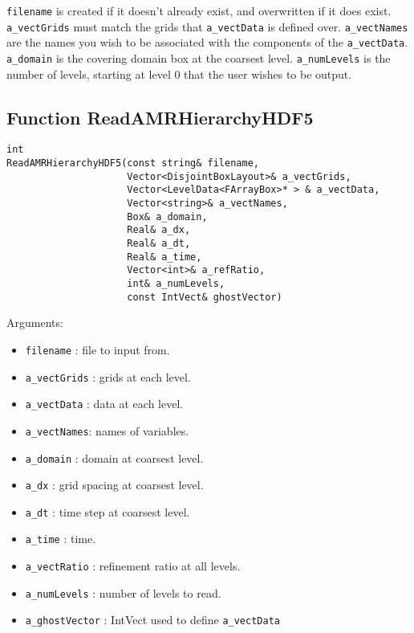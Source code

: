 \verb+filename+ is created if it doesn't already exist, and overwritten
if it does exist.  \verb+a_vectGrids+ must match the grids that 
\verb+a_vectData+ is defined over. \verb+a_vectNames+ are the names
you wish to be associated with the components of the \verb+a_vectData+.
\verb+a_domain+ is the covering domain box at the coarsest level.
\verb+a_numLevels+ is the number of levels, starting at level 0 that
the user wishes to be output.


\subsection{Function ReadAMRHierarchyHDF5}

\begin{verbatim}
int
ReadAMRHierarchyHDF5(const string& filename,
                     Vector<DisjointBoxLayout>& a_vectGrids,
                     Vector<LevelData<FArrayBox>* > & a_vectData,
                     Vector<string>& a_vectNames, 
                     Box& a_domain,
                     Real& a_dx,          
                     Real& a_dt,
                     Real& a_time,                                         
                     Vector<int>& a_refRatio,
                     int& a_numLevels,
                     const IntVect& ghostVector)
\end{verbatim}

Arguments:

\begin{itemize}
\item \verb|filename|  :  file to input from.
\item \verb|a_vectGrids| : grids at each level.
\item \verb|a_vectData| :  data at each level.
\item \verb|a_vectNames|:  names of variables.
\item \verb|a_domain| :  domain at coarsest level.
\item \verb|a_dx|     :  grid spacing at coarsest level.
\item \verb|a_dt|     :  time step at coarsest level.
\item \verb|a_time|     :  time.
\item \verb|a_vectRatio| :  refinement ratio at all levels.
\item \verb|a_numLevels| :  number of levels to read.
\item \verb|a_ghostVector| : IntVect used to define \verb|a_vectData|
\end{itemize}

